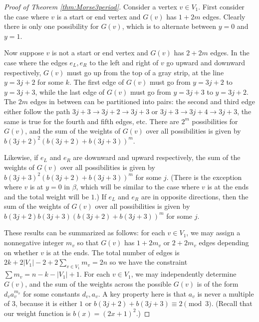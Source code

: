 \begin{proof}[Proof of Theorem \ref{thm:Morse3period}]
    Consider a vertex $v\in V_1$. First consider the case where $v$ is a start or end vertex and $G(v)$ has $1+2m$ edges. Clearly there is only one possibility for $G(v)$, which is to alternate between $y=0$ and $y=1$.
    
    Now suppose $v$ is not a start or end vertex and $G(v)$ has $2+2m$ edges. In the case where the edges $e_{L}, e_{R}$ to the left and right of $v$ go upward and downward respectively, $G(v)$ must go up from the top of a gray strip, at the line $y=3j+2$ for some $k$. The first edge of $G(v)$ must go from $y=3j+2$ to $y=3j+3$, while the last edge of $G(v)$ must go from $y=3j+3$ to $y=3j+2$. The $2m$ edges in between can be partitioned into pairs: the second and third edge either follow the path $3j+3\to 3j+2\to 3j+3$ or $3j+3\to 3j+4\to 3j+3$, the same is true for the fourth and fifth edges, etc. There are $2^m$ possibilities for $G(v)$, and the sum of the weights of $G(v)$ over all possibilities is given by $b(3j+2)^2(b(3j+2)+b(3j+3))^m$.
    
    Likewise, if $e_{L}$ and $e_{R}$ are downward and upward respectively, the sum of the weights of $G(v)$ over all possibilities is given by $b(3j+3)^2(b(3j+2)+b(3j+3))^m$ for some $j$. (There is the exception where $v$ is at $y=0$ in $\beta$, which will be similar to the case where $v$ is at the ends and the total weight will be $1$.) If $e_{L}$ and $e_{R}$ are in opposite directions, then the sum of the weights of $G(v)$ over all possibilities is given by $b(3j+2)b(3j+3)(b(3j+2)+b(3j+3))^m$ for some $j$.
    
    These results can be summarized as follows: for each $v\in V_1$, we may assign a nonnegative integer $m_v$ so that $G(v)$ has $1+2m_v$ or $2+2m_v$ edges depending on whether $v$ is at the ends. The total number of edges is $2k+2\lvert V_1\rvert-2 +2\sum_{v\in V_1} m_v=2n$ so we have the constraint $\sum m_v = n-k-\lvert V_1\rvert+1$. For each $v\in V_1$, we may independently determine $G(v)$, and the sum of the weights across the possible $G(v)$ is of the form $d_va_v^{m_v}$ for some constants $d_v, a_v$. A key property here is that $a_v$ is never a multiple of $3$, because it is either $1$ or $b(3j+2)+b(3j+3)\equiv 2\pmod{3}$. (Recall that our weight function is $b(x)=(2x+1)^2$.)   
    
    

\end{proof}
